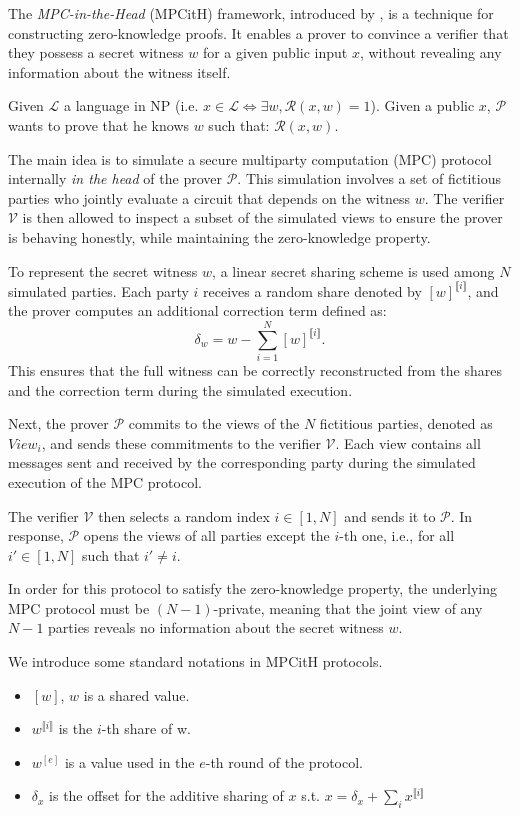 \documentclass[english]{article}
\newcommand{\lir}{\llbracket i \rrbracket}
\begin{document}
		The \emph{MPC-in-the-Head} (MPCitH) framework, introduced by \cite{IKOS07}, is a technique for constructing zero-knowledge proofs. It enables a prover to convince a verifier that they possess a secret witness $w$ for a given public input $x$, without revealing any information about the witness itself.
		
		Given $\mathcal{L}$ a language in NP (i.e. $x \in \mathcal{L} \Longleftrightarrow \exists w, \mathcal{R}(x, w) = 1$). Given a public $x$, $\mathcal{P}$ wants to prove that he knows $w$ such that: $\mathcal{R}(x, w)$.
		
		The main idea is to simulate a secure multiparty computation (MPC) protocol internally \textit{in the head} of the prover $\mathcal{P}$. This simulation involves a set of fictitious parties who jointly evaluate a circuit that depends on the witness $w$. The verifier $\mathcal{V}$ is then allowed to inspect a subset of the simulated views to ensure the prover is behaving honestly, while maintaining the zero-knowledge property.
		
		To represent the secret witness $w$, a linear secret sharing scheme is used among $N$ simulated parties. Each party $i$ receives a random share denoted by $[w]^{\lir}$, and the prover computes an additional correction term defined as:
		$$
		\delta_w = w - \sum_{i=1}^{N} [w]^{\lir}.
		$$
		This ensures that the full witness can be correctly reconstructed from the shares and the correction term during the simulated execution.
		
		Next, the prover $\mathcal{P}$ commits to the views of the $N$ fictitious parties, denoted as $View_i$, and sends these commitments to the verifier $\mathcal{V}$. Each view contains all messages sent and received by the corresponding party during the simulated execution of the MPC protocol.
		
		The verifier $\mathcal{V}$ then selects a random index $i \in [1, N]$ and sends it to $\mathcal{P}$. In response, $\mathcal{P}$ opens the views of all parties except the $i$-th one, i.e., for all $i' \in [1, N]$ such that $i' \neq i$.
		
		In order for this protocol to satisfy the zero-knowledge property, the underlying MPC protocol must be $(N-1)$-private, meaning that the joint view of any $N-1$ parties reveals no information about the secret witness $w$.
		
		We introduce some standard notations in MPCitH protocols. 
		\begin{itemize}
			\item $[w]$, $w$ is a shared value.
			\item $w^{\lir}$ is the $i$-th share of w.
			\item $w^[e]$ is a value used in the $e$-th round of the protocol.
			\item $\delta_x$ is the offset for the additive sharing of $x$ s.t. $x = \delta_x + \sum_i x^{\lir}$
		\end{itemize}
		
\end{document}
